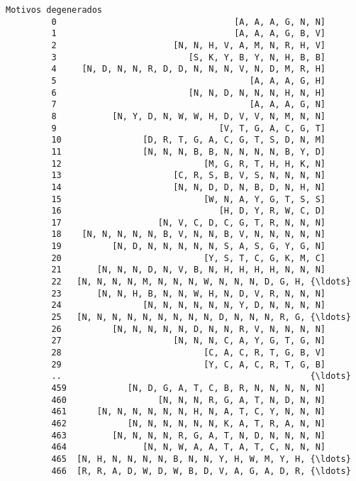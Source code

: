 \documentclass[11pt]{article}
\begin{document}
\begin{Verbatim}[commandchars=\\\{\}]
                                            Motivos degenerados  
         0                                   [A, A, A, G, N, N]  
         1                                   [A, A, A, G, B, V]  
         2                       [N, N, H, V, A, M, N, R, H, V]  
         3                          [S, K, Y, B, Y, N, H, B, B]  
         4     [N, D, N, N, R, D, D, N, N, N, V, N, D, M, R, H]  
         5                                      [A, A, A, G, H]  
         6                          [N, N, D, N, N, N, H, N, H]  
         7                                      [A, A, A, G, N]  
         8           [N, Y, D, N, W, W, H, D, V, V, N, M, N, N]  
         9                                [V, T, G, A, C, G, T]  
         10                [D, R, T, G, A, C, G, T, S, D, N, M]  
         11                [N, N, N, B, B, N, N, N, N, B, Y, D]  
         12                            [M, G, R, T, H, H, K, N]  
         13                      [C, R, S, B, V, S, N, N, N, N]  
         14                      [N, N, D, D, N, B, D, N, H, N]  
         15                            [W, N, A, Y, G, T, S, S]  
         16                               [H, D, Y, R, W, C, D]  
         17                   [N, V, C, D, C, G, T, R, N, N, N]  
         18    [N, N, N, N, N, B, V, N, N, B, V, N, N, N, N, N]  
         19          [N, D, N, N, N, N, N, S, A, S, G, Y, G, N]  
         20                            [Y, S, T, C, G, K, M, C]  
         21       [N, N, N, D, N, V, B, N, H, H, H, H, N, N, N]  
         22   [N, N, N, N, M, N, N, N, W, N, N, N, D, G, H, {\ldots}  
         23       [N, N, H, B, N, N, W, H, N, D, V, R, N, N, N]  
         24                [N, N, N, N, N, N, Y, D, N, N, N, N]  
         25   [N, N, N, N, N, N, N, N, N, D, N, N, N, R, G, {\ldots}  
         26          [N, N, N, N, N, D, N, N, R, V, N, N, N, N]  
         27                      [N, N, N, C, A, Y, G, T, G, N]  
         28                            [C, A, C, R, T, G, B, V]  
         29                            [Y, C, A, C, R, T, G, B]  
         ..                                                 {\ldots}  
         459            [N, D, G, A, T, C, B, R, N, N, N, N, N]  
         460                  [N, N, N, R, G, A, T, N, D, N, N]  
         461      [N, N, N, N, N, N, H, N, A, T, C, Y, N, N, N]  
         462            [N, N, N, N, N, N, K, A, T, R, A, N, N]  
         463         [N, N, N, N, R, G, A, T, N, D, N, N, N, N]  
         464               [N, N, W, A, A, T, A, T, C, N, N, N]  
         465  [N, H, N, N, N, N, B, N, N, Y, H, W, M, Y, H, {\ldots}  
         466  [R, R, A, D, W, D, W, B, D, V, A, G, A, D, R, {\ldots}  

\end{Verbatim}
\end{document}
